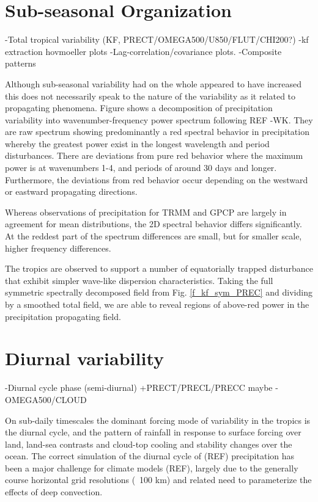 \documentclass[draft,ms]{AGUTeX}
\begin{document}
\begin{article}
\section{Sub-seasonal Organization}
-Total tropical variability (KF, PRECT/OMEGA500/U850/FLUT/CHI200?)
-kf extraction hovmoeller plots
-Lag-correlation/covariance plots.
-Composite patterns

Although sub-seasonal variability had on the whole appeared to have increased this does not necessarily speak to the nature of the variability as it related to propagating phenomena. Figure shows a decomposition of precipitation variability into wavenumber-frequency power spectrum following REF -WK. They are raw spectrum showing predominantly a red spectral behavior in precipitation whereby the greatest power exist in the longest wavelength and period disturbances. There are deviations from pure red behavior where the maximum power is at wavenumbers 1-4, and periods of around 30 days and longer. Furthermore, the deviations from red behavior occur depending on the westward or eastward propagating directions.

Whereas observations of precipitation for TRMM and GPCP are largely in agreement for mean distributions, the 2D spectral behavior differs significantly. At the reddest part of the spectrum differences are small, but for smaller scale, higher frequency differences.

The tropics are observed to support a number of equatorially trapped disturbance that exhibit simpler wave-like dispersion characteristics. Taking the full symmetric spectrally decomposed field from Fig. \ref{f_kf_sym_PREC} and dividing by a smoothed total field, we are able to reveal regions of above-red power in the precipitation propagating field.   



\section{Diurnal variability}
-Diurnal cycle phase (semi-diurnal)
+PRECT/PRECL/PRECC maybe
-OMEGA500/CLOUD

On sub-daily timescales the dominant forcing mode of variability in the tropics is the diurnal cycle, and the pattern of rainfall in response to surface forcing over land, land-sea contrasts and cloud-top cooling and stability changes over the ocean. The correct simulation of the diurnal cycle of (REF) precipitation has been a major challenge for climate models (REF), largely due to the generally course horizontal grid resolutions (~100 km) and related need to parameterize the effects of deep convection. 





\end{article}
\end{document}

